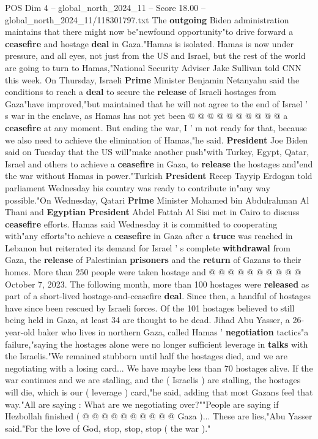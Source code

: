 \begin{textsample}{POS Dim 4 – global\_north\_2024\_11 – Score 18.00 – global\_north\_2024\_11/118301797.txt}
The \textbf{outgoing} Biden administration maintains that there might now be"newfound opportunity"to drive forward a \textbf{ceasefire} and hostage \textbf{deal} in Gaza."Hamas is isolated.
Hamas is now under pressure, and all eyes, not just from the US and Israel, but the rest of the world are going to turn to Hamas,"National Security Adviser Jake Sullivan told CNN this week.
On Thursday, Israeli \textbf{Prime} Minister Benjamin Netanyahu said the conditions to reach a \textbf{deal} to secure the \textbf{release} of Israeli hostages from Gaza"have improved,"but maintained that he will not agree to the end of Israel ' s war in the enclave, as Hamas has not yet been @ @ @ @ @ @ @ @ @ @ a \textbf{ceasefire} at any moment.
But ending the war, I ' m not ready for that, because we also need to achieve the elimination of Hamas,"he said. \textbf{President} Joe Biden said on Tuesday that the US will"make another push"with Turkey, Egypt, Qatar, Israel and others to achieve a \textbf{ceasefire} in Gaza, to \textbf{release} the hostages and"end the war without Hamas in power."Turkish \textbf{President} Recep Tayyip Erdogan told parliament Wednesday his country was ready to contribute in"any way possible."On Wednesday, Qatari \textbf{Prime} Minister Mohamed bin Abdulrahman Al Thani and \textbf{Egyptian} \textbf{President} Abdel Fattah Al Sisi met in Cairo to discuss \textbf{ceasefire} efforts.
Hamas said Wednesday it is committed to cooperating with"any efforts"to achieve a \textbf{ceasefire} in Gaza after a \textbf{truce} was reached in Lebanon but reiterated its demand for Israel ' s complete \textbf{withdrawal} from Gaza, the \textbf{release} of Palestinian \textbf{prisoners} and the \textbf{return} of Gazans to their homes.
More than 250 people were taken hostage and @ @ @ @ @ @ @ @ @ @ October 7, 2023.
The following month, more than 100 hostages were \textbf{released} as part of a short-lived hostage-and-ceasefire \textbf{deal}.
Since then, a handful of hostages have since been rescued by Israeli forces.
Of the 101 hostages believed to still being held in Gaza, at least 34 are thought to be dead.
Jihad Abu Yasser, a 26-year-old baker who lives in northern Gaza, called Hamas ' \textbf{negotiation} tactics"a failure,"saying the hostages alone were no longer sufficient leverage in \textbf{talks} with the Israelis."We remained stubborn until half the hostages died, and we are negotiating with a losing card...
We have maybe less than 70 hostages alive.
If the war continues and we are stalling, and the ( Israelis ) are stalling, the hostages will die, which is our ( leverage ) card,"he said, adding that most Gazans feel that way."All are saying : What are we negotiating over?""People are saying if Hezbollah finished ( @ @ @ @ @ @ @ @ @ @ Gaza )...
These are lies,"Abu Yasser said."For the love of God, stop, stop, stop ( the war )."

\end{textsample}
